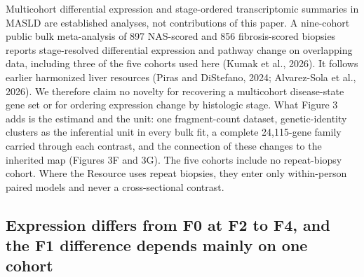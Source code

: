 Multicohort differential expression and stage-ordered transcriptomic summaries in MASLD are established analyses, not contributions of this paper. A nine-cohort public bulk meta-analysis of 897 NAS-scored and 856 fibrosis-scored biopsies reports stage-resolved differential expression and pathway change on overlapping data, including three of the five cohorts used here (Kumak et al., 2026). It follows earlier harmonized liver resources (Piras and DiStefano, 2024; Alvarez-Sola et al., 2026). We therefore claim no novelty for recovering a multicohort disease-state gene set or for ordering expression change by histologic stage. What Figure 3 adds is the estimand and the unit: one fragment-count dataset, genetic-identity clusters as the inferential unit in every bulk fit, a complete 24,115-gene family carried through each contrast, and the connection of these changes to the inherited map (Figures 3F and 3G). The five cohorts include no repeat-biopsy cohort. Where the Resource uses repeat biopsies, they enter only within-person paired models and never a cross-sectional contrast.

\subsection{Expression differs from F0 at F2 to F4, and the F1 difference depends mainly on one cohort}\label{expression-differs-from-f0-at-f2-to-f4-and-the-f1-difference-depends-mainly-on-one-cohort}

